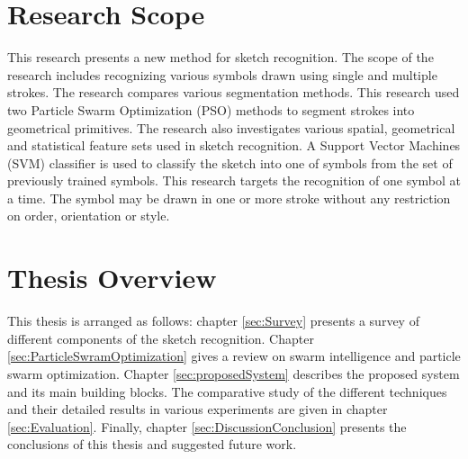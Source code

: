 \section{Research Scope}
This research  presents a new method for sketch recognition. The scope of the research includes recognizing various symbols drawn using single and multiple strokes. The research compares various segmentation methods. This research used two Particle Swarm Optimization (PSO) \cite{PSOFirst} methods to segment strokes into geometrical primitives. The research also investigates various spatial, geometrical and statistical feature sets used in sketch recognition. A Support Vector Machines (SVM) classifier \cite{svmintroduce} is used to classify the sketch into one of symbols from the set of previously trained symbols. This research targets the recognition of one symbol at a time. The symbol may be drawn in one or more stroke without any restriction on order, orientation or style.

 
\section{Thesis Overview}
This thesis is arranged as follows: chapter \ref{sec:Survey} presents a survey of different components of the sketch recognition. Chapter \ref{sec:ParticleSwramOptimization} gives a review on swarm intelligence and particle swarm optimization.  Chapter \ref{sec:proposedSystem} describes the proposed system and its main building blocks. The comparative study of the different techniques and their detailed results in various experiments are given in chapter \ref{sec:Evaluation}. Finally, chapter \ref{sec:DiscussionConclusion} presents the conclusions of this thesis and suggested future work.
